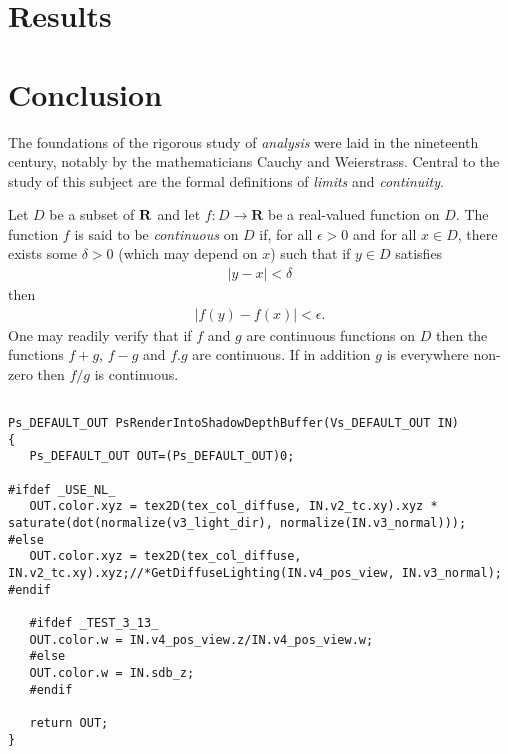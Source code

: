 \documentclass[12pt]{scrartcl}
\begin{document}
\section{Results}

\section{Conclusion}

The foundations of the rigorous study of \textit{analysis}
were laid in the nineteenth century, notably by the
mathematicians Cauchy and Weierstrass. Central to the
study of this subject are the formal definitions of
\textit{limits} and \textit{continuity}.

Let $D$ be a subset of $\bf R$ and let
$f \colon D \to \textbf{R}$ be a real-valued function on
$D$. The function $f$ is said to be \textit{continuous} on
$D$ if, for all $\epsilon > 0$ and for all $x \in D$,
there exists some $\delta > 0$ (which may depend on $x$)
such that if $y \in D$ satisfies
\begin{eqnarray*}
|y - x| < \delta
\end{eqnarray*}
then
\begin{eqnarray}
|f(y) - f(x)| < \epsilon.
\end{eqnarray}
One may readily verify that if $f$ and $g$ are continuous
functions on $D$ then the functions $f+g$, $f-g$ and
$f.g$ are continuous. If in addition $g$ is everywhere
non-zero then $f/g$ is continuous.

\lstset{language=C++,basicstyle=\footnotesize}
\begin{lstlisting}[caption=Test]

Ps_DEFAULT_OUT PsRenderIntoShadowDepthBuffer(Vs_DEFAULT_OUT IN)
{
   Ps_DEFAULT_OUT OUT=(Ps_DEFAULT_OUT)0;

#ifdef _USE_NL_
   OUT.color.xyz = tex2D(tex_col_diffuse, IN.v2_tc.xy).xyz * saturate(dot(normalize(v3_light_dir), normalize(IN.v3_normal)));
#else
   OUT.color.xyz = tex2D(tex_col_diffuse, IN.v2_tc.xy).xyz;//*GetDiffuseLighting(IN.v4_pos_view, IN.v3_normal);
#endif

   #ifdef _TEST_3_13_
   OUT.color.w = IN.v4_pos_view.z/IN.v4_pos_view.w;
   #else
   OUT.color.w = IN.sdb_z;
   #endif

   return OUT;
}

\end{lstlisting}
\end{document}

